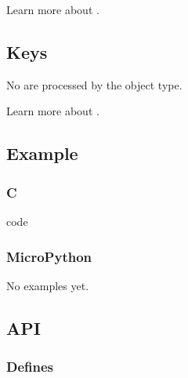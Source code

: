 \documentclass[letterpaper,10pt,english]{sphinxmanual}
\begin{document}
Learn more about {\hyperref[\detokenize{overview/events::doc}]{}}.


\subsection{Keys}
\label{\detokenize{object-types/canvas:keys}}
No  are processed by the object type.

Learn more about {\hyperref[\detokenize{overview/indev::doc}]{}}.


\subsection{Example}
\label{\detokenize{object-types/canvas:example}}

\subsubsection{C}
\label{\detokenize{object-types/canvas:c}}
code

\begin{sphinxVerbatim}[commandchars=\\\{\}]

\end{sphinxVerbatim}


\subsubsection{MicroPython}
\label{\detokenize{object-types/canvas:micropython}}
No examples yet.


\subsection{API}
\label{\detokenize{object-types/canvas:api}}\subsubsection*{Defines}

\begin{fulllineitems}
\label{\detokenize{object-types/canvas:c.LV_CANVAS_BUF_SIZE_TRUE_COLOR}}
\end{fulllineitems}
\end{document}

